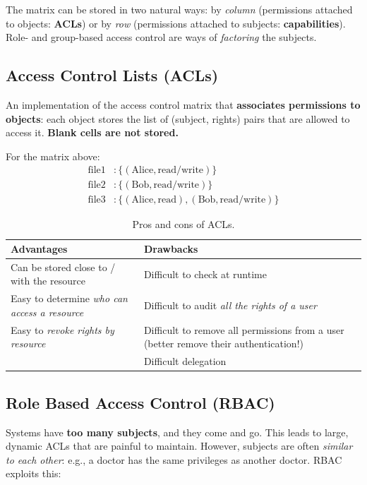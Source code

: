 The matrix can be stored in two natural ways: by \emph{column} (permissions attached to objects: \textbf{ACLs}) or by \emph{row} (permissions attached to subjects: \textbf{capabilities}). Role- and group-based access control are ways of \emph{factoring} the subjects.

\subsection{Access Control Lists (ACLs)}

\begin{definition}
An implementation of the access control matrix that \textbf{associates permissions to objects}: each object stores the list of (subject, rights) pairs that are allowed to access it. \textbf{Blank cells are not stored.}
\end{definition}

For the matrix above:
\begin{align*}
\text{file1} &: \{(\text{Alice}, \text{read/write})\}\\
\text{file2} &: \{(\text{Bob}, \text{read/write})\}\\
\text{file3} &: \{(\text{Alice}, \text{read}), (\text{Bob}, \text{read/write})\}
\end{align*}

\begin{table}[h]
\centering
\begin{tabular}{@{}p{6.3cm}p{6.7cm}@{}}
\toprule
\textbf{Advantages} & \textbf{Drawbacks} \\
\midrule
Can be stored close to / with the resource & Difficult to check at runtime \\
Easy to determine \emph{who can access a resource} & Difficult to audit \emph{all the rights of a user} \\
Easy to \emph{revoke rights by resource} & Difficult to remove all permissions from a user (better remove their authentication!) \\
 & Difficult delegation \\
\bottomrule
\end{tabular}
\caption{Pros and cons of ACLs.}
\end{table}

\subsection{Role Based Access Control (RBAC)}

Systems have \textbf{too many subjects}, and they come and go. This leads to large, dynamic ACLs that are painful to maintain. However, subjects are often \emph{similar to each other}: e.g., a doctor has the same privileges as another doctor. RBAC exploits this:

